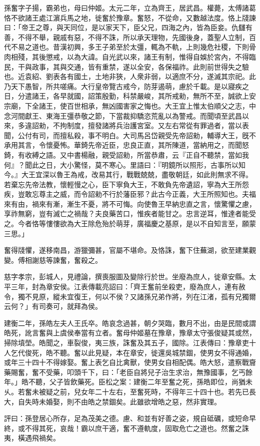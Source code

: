 
\begin{pinyinscope}
孫奮字子揚，霸弟也，母曰仲姬。太元二年，立為齊王，居武昌。權薨，太傅諸葛恪不欲諸王處江濵兵馬之地，徙奮於豫章。奮怒，不從命，又數越法度。恪上牋諫曰：「帝王之尊，與天同位，是以家天下，臣父兄，四海之內，皆為臣妾。仇讎有善，不得不舉，親戚有惡，不得不誅，所以承天理物，先國後身，蓋聖人立制，百代不易之道也。昔漢初興，多王子弟至於太彊，輒為不軌，上則幾危社稷，下則骨肉相殘，其後懲戒，以為大諱。自光武以來，諸王有制，惟得自娛於宮內，不得臨民，干與政事，其與交通，皆有重禁，遂以全安，各保福祚。此則前世得失之驗也。近袁紹、劉表各有國土，土地非狹，人衆非弱，以適庶不分，遂滅其宗祀。此乃天下愚智，所共嗟痛。大行皇帝覽古戒今，防芽遏萌，慮於千載。是以寢疾之日，分遣諸王，各早就國，詔策殷勤，科禁嚴峻，其所戒勑，無所不至，誠欲上安宗廟，下全諸王，使百世相承，無凶國害家之悔也。大王宜上惟太伯順父之志，中念河間獻王、東海王彊恭敬之節，下當裁抑驕恣荒亂以為警戒。而聞頃至武昌以來，多違詔勑，不拘制度，擅發諸將兵治護宮室。又左右常從有罪過者，當以表聞，公付有司，而擅私殺，事不明白。大司馬呂岱親受先帝詔勑，輔導大王，旣不承用其言，令懷憂怖。華錡先帝近臣，忠良正直，其所陳道，當納用之，而聞怒錡，有收縛之語。又中書楊融，親受詔勑，所當恭肅，云『正自不聽禁，當如我何』？聞此之日，大小驚怪，莫不寒心。里語曰：『明鏡所以照形，古事所以知今。』大王宜深以魯王為戒，改易其行，戰戰兢兢，盡敬朝廷，如此則無求不得。若棄忘先帝法教，懷輕慢之心，臣下寧負大王，不敢負先帝遺詔，寧為大王所怨疾，豈敢忘尊主之威，而令詔勑不行於藩臣邪？此古今正義，大王所照知也。夫福來有由，禍來有漸，漸生不憂，將不可悔。向使魯王早納忠直之言，懷驚懼之慮，享祚無窮，豈有滅亡之禍哉？夫良藥苦口，惟疾者能甘之。忠言逆耳，惟達者能受之。今者恪等慺慺欲為大王除危殆於萌芽，廣福慶之基原，是以不自知言至，願蒙三思。」

奮得牋懼，遂移南昌，游獵彌甚，官屬不堪命。及恪誅，奮下住蕪湖，欲至建業觀變。傅相謝慈等諫奮，奮殺之。

慈字孝宗，彭城人，見禮論，撰喪服圖及變除行於世。坐廢為庶人，徙章安縣。太平三年，封為章安侯。江表傳載亮詔曰：「齊王奮前坐殺吏，廢為庶人，連有赦令，獨不見原，縱未宜復王，何以不侯？又諸孫兄弟作將，列在江渚，孤有兄獨爾云何？」有司奏可，就拜為侯。

建衡二年，孫皓左夫人王氏卒。皓哀念過甚，朝夕哭臨，數月不出，由是民間或謂皓死，訛言奮與上虞侯奉當有立者。奮母仲姬墓在豫章，豫章太守張俊疑其或然，掃除墳塋。皓聞之，車裂俊，夷三族，誅奮及其五子，國除。江表傳曰：豫章吏十人乞代俊死，皓不聽。奮以此見疑，本在章安，徙還吳城禁錮，使男女不得通婚，或年三十四十不得嫁娶。奮上表乞自比禽獸，使男女自相配偶。皓大怒，遣察戰齎藥賜奮，奮不受藥，叩頭千下，曰：「老臣自將兒子治生求治，無豫國事，乞丐餘年。」皓不聽，父子皆飲藥死。臣松之案：建衡二年至奮之死，孫皓即位，尚猶未乆。若奮未被疑之前，兒女年二十左右，至奮死時，不得年三十四十也。若先已長大，自失時未婚娶，則不由皓之禁錮矣。此雖欲增皓之惡，然非實理。

評曰：孫登居心所存，足為茂美之德。慮、和並有好善之姿，規自砥礪，或短命早終，或不得其死，哀哉！霸以庶干適，奮不遵軌度，固取危亡之道也。然奮之誅夷，橫遇飛禍矣。


\end{pinyinscope}